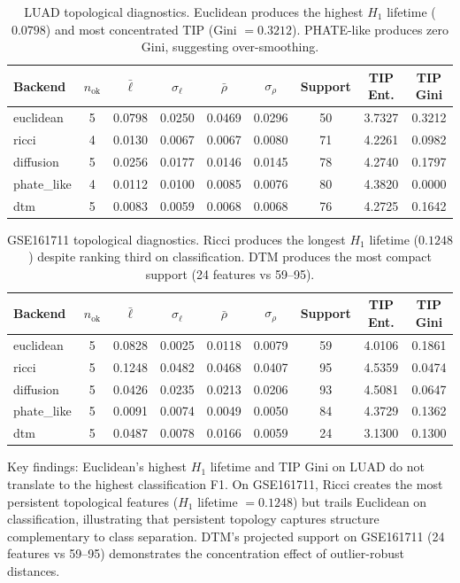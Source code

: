\documentclass[12pt]{article}
\begin{document}
\begin{table}[h]
\centering
\small
\begin{tabular}{@{}lcccccccc@{}}
\toprule
Backend & $n_{\text{ok}}$ & $\bar{\ell}$ & $\sigma_\ell$ & $\bar{\rho}$ & $\sigma_\rho$ & Support & TIP Ent. & TIP Gini \\
\midrule
euclidean & 5 & 0.0798 & 0.0250 & 0.0469 & 0.0296 & 50 & 3.7327 & 0.3212 \\
ricci & 4 & 0.0130 & 0.0067 & 0.0067 & 0.0080 & 71 & 4.2261 & 0.0982 \\
diffusion & 5 & 0.0256 & 0.0177 & 0.0146 & 0.0145 & 78 & 4.2740 & 0.1797 \\
phate\_like & 4 & 0.0112 & 0.0100 & 0.0085 & 0.0076 & 80 & 4.3820 & 0.0000 \\
dtm & 5 & 0.0083 & 0.0059 & 0.0068 & 0.0068 & 76 & 4.2725 & 0.1642 \\
\bottomrule
\end{tabular}
\caption{LUAD topological diagnostics. Euclidean produces the highest $H_1$ lifetime ($0.0798$) and most concentrated TIP (Gini $= 0.3212$). PHATE-like produces zero Gini, suggesting over-smoothing.}
\label{tab:diag_luad}
\end{table}

\begin{table}[h]
\centering
\small
\begin{tabular}{@{}lcccccccc@{}}
\toprule
Backend & $n_{\text{ok}}$ & $\bar{\ell}$ & $\sigma_\ell$ & $\bar{\rho}$ & $\sigma_\rho$ & Support & TIP Ent. & TIP Gini \\
\midrule
euclidean & 5 & 0.0828 & 0.0025 & 0.0118 & 0.0079 & 59 & 4.0106 & 0.1861 \\
ricci & 5 & 0.1248 & 0.0482 & 0.0468 & 0.0407 & 95 & 4.5359 & 0.0474 \\
diffusion & 5 & 0.0426 & 0.0235 & 0.0213 & 0.0206 & 93 & 4.5081 & 0.0647 \\
phate\_like & 5 & 0.0091 & 0.0074 & 0.0049 & 0.0050 & 84 & 4.3729 & 0.1362 \\
dtm & 5 & 0.0487 & 0.0078 & 0.0166 & 0.0059 & 24 & 3.1300 & 0.1300 \\
\bottomrule
\end{tabular}
\caption{GSE161711 topological diagnostics. Ricci produces the longest $H_1$ lifetime ($0.1248$) despite ranking third on classification. DTM produces the most compact support (24 features vs 59--95).}
\label{tab:diag_gse}
\end{table}

Key findings:
Euclidean's highest $H_1$ lifetime and TIP Gini on LUAD do not translate to the highest classification F1.
On GSE161711, Ricci creates the most persistent topological features ($H_1$ lifetime $= 0.1248$) but trails Euclidean on classification, illustrating that persistent topology captures structure complementary to class separation.
DTM's projected support on GSE161711 (24 features vs 59--95) demonstrates the concentration effect of outlier-robust distances.
\end{document}
